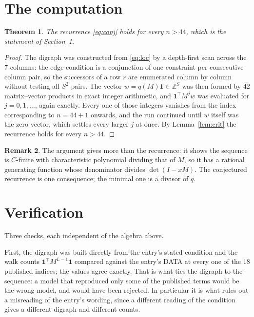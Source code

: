 \documentclass[11pt,a4paper]{article}
\theoremstyle{plain}
\newtheorem{theorem}{Theorem}
\theoremstyle{definition}
\newtheorem{remark}[theorem]{Remark}
\begin{document}
\section{The computation}

\begin{theorem}
The recurrence \eqref{eq:conj} holds for every $n>44$, which is the statement of
Section~1.
\end{theorem}

\begin{proof}
The digraph was constructed from \eqref{eq:loc} by a depth-first scan across the $7$
columns: the edge condition is a conjunction of one constraint per consecutive column
pair, so the successors of a row $r$ are enumerated column by column without testing all
$S^2$ pairs. The vector $w=q(M)\mathbf{1}\in\mathbb{Z}^{S}$ was then formed by $42$
matrix--vector products in exact integer arithmetic, and $\mathbf{1}^{\!\top}M^{j}w$ was
evaluated for $j=0,1,\dots$, again exactly. Every one of those integers vanishes from the
index corresponding to $n=44+1$ onwards, and the run continued until $w$ itself was the
zero vector, which settles every larger $j$ at once. By Lemma~\ref{lem:crit} the recurrence
holds for every $n>44$.
\end{proof}

\begin{remark}
The argument gives more than the recurrence: it shows the sequence is $C$-finite with
characteristic polynomial dividing that of $M$, so it has a rational generating function
whose denominator divides $\det(I-xM)$. The conjectured recurrence is one consequence; the
minimal one is a divisor of $q$.
\end{remark}

\section{Verification}

Three checks, each independent of the algebra above.

First, the digraph was built directly from the entry's stated condition and the walk counts
$\mathbf{1}^{\!\top}M^{L-1}\mathbf{1}$ compared against the entry's DATA at
every one of the $18$ published indices; the values agree exactly. That is what ties
the digraph to the sequence: a model that reproduced only some of the published terms would
be the wrong model, and would have been rejected. In particular it is what rules out a
misreading of the entry's wording, since a different reading of the condition gives a
different digraph and different counts.
\end{document}

